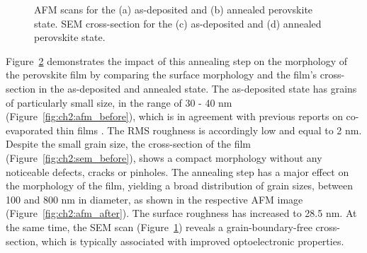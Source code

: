 \begin{figure}[htbp]
\begin{subfigure}[t]{0.35\textwidth}
        \caption{}
        \label{fig:ch2:sem_after}
    \end{subfigure}
    \caption{AFM scans for the (a) as-deposited and (b) annealed perovskite state. SEM cross-section for the (c) as-deposited and (d) annealed perovskite state.}
    \label{fig:ch2:afm_sem}
\end{figure}


Figure~\ref{fig:ch2:afm_sem} demonstrates the impact of this annealing step on the morphology of the perovskite film by comparing the surface morphology and the film's cross-section in the as-deposited and annealed state. The as-deposited state has grains of particularly small size, in the range of 30 - 40 nm (Figure~\ref{fig:ch2:afm_before}), which is in agreement with previous reports on co-evaporated  thin films \cite{Frolova2017HighlyPbI2, Zhang2023SemitransparentAbsorber}. The RMS roughness is accordingly low and equal to 2 nm. Despite the small grain size, the cross-section of the film (Figure~\ref{fig:ch2:sem_before}), shows a compact morphology without any noticeable defects, cracks or pinholes. The annealing step has a major effect on the morphology of the film, yielding a broad distribution of grain sizes, between 100 and 800 nm in diameter, as shown in the respective AFM image (Figure~\ref{fig:ch2:afm_after}). The surface roughness has increased to 28.5 nm. At the same time, the SEM scan (Figure~\ref{fig:ch2:sem_after}) reveals a grain-boundary-free cross-section, which is typically associated with improved optoelectronic properties. 




